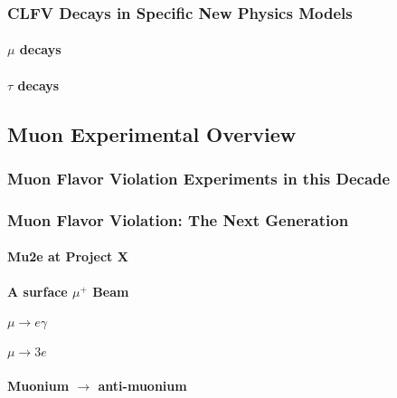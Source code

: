 \subsubsection{CLFV Decays in Specific New Physics Models}

\paragraph{$\mu$ decays}

\paragraph{$\tau$ decays}

\subsection{Muon Experimental Overview}\label{sec:cl:muexp}

\subsubsection{Muon Flavor Violation Experiments in this Decade}

\subsubsection{Muon Flavor Violation: The Next Generation}

\paragraph{Mu2e at Project X}

\paragraph{A surface $\mu^+$ Beam}

\paragraph{$\mu \to e \gamma$}


\paragraph{$\mu \to 3e$}

\paragraph{Muonium $\to$ anti-muonium}


